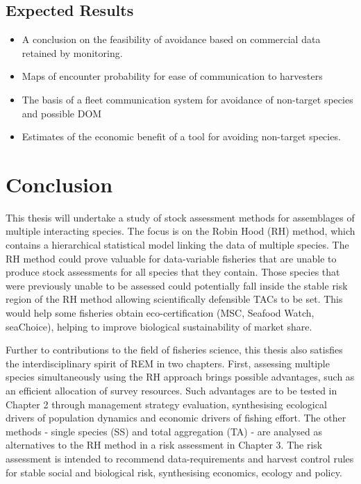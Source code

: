 \documentclass[12pt,]{scrartcl}
\providecommand{\tightlist}{%
  \setlength{\itemsep}{0pt}\setlength{\parskip}{0pt}}
\begin{document}
\subsection{Expected Results}\label{expected-results-3}

\begin{itemize}
\tightlist
\item
  A conclusion on the feasibility of avoidance based on commercial data
  retained by monitoring.
\item
  Maps of encounter probability for ease of communication to harvesters
\item
  The basis of a fleet communication system for avoidance of non-target
  species and possible DOM
\item
  Estimates of the economic benefit of a tool for avoiding non-target
  species.
\end{itemize}

\section{Conclusion}\label{conclusion}

This thesis will undertake a study of stock assessment methods for
assemblages of multiple interacting species. The focus is on the Robin
Hood (RH) method, which contains a hierarchical statistical model
linking the data of multiple species. The RH method could prove valuable
for data-variable fisheries that are unable to produce stock assessments
for all species that they contain. Those species that were previously
unable to be assessed could potentially fall inside the stable risk
region of the RH method allowing scientifically defensible TACs to be
set. This would help some fisheries obtain eco-certification (MSC,
Seafood Watch, seaChoice), helping to improve biological sustainability
of market share.

Further to contributions to the field of fisheries science, this thesis
also satisfies the interdisciplinary spirit of REM in two chapters.
First, assessing multiple species simultaneously using the RH approach
brings possible advantages, such as an efficient allocation of survey
resources. Such advantages are to be tested in Chapter 2 through
management strategy evaluation, synthesising ecological drivers of
population dynamics and economic drivers of fishing effort. The other
methods - single species (SS) and total aggregation (TA) - are analysed
as alternatives to the RH method in a risk assessment in Chapter 3. The
risk assessment is intended to recommend data-requirements and harvest
control rules for stable social and biological risk, synthesising
economics, ecology and policy.
\end{document}
